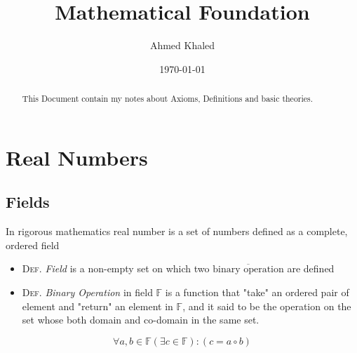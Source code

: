 \documentclass[11pt, a4paper]{article}
\author{Ahmed Khaled}
\date{\today}
\title{Mathematical Foundation}
\begin{document}
\maketitle
\begin{abstract}
This Document contain my notes about Axioms, Definitions and basic theories.
\end{abstract}

\section{Real Numbers}
\label{sec:org71e7ac2}
\subsection{Fields}
\label{sec:org6fb7fdd}
In rigorous mathematics real number is a set of numbers defined as a complete, ordered field

\begin{itemize}
\item \textsc{Def}. \emph{Field} is a non-empty set on which two \(\overline{\mbox{binary operation}}\) are
defined 

\item \textsc{Def}. \emph{Binary Operation} in field \(\mathbb{F}\) is a function that "take"
an ordered pair of element and "return" an element in \(\mathbb{F}\), and it said to be
the operation on the set whose both domain and co-domain in the same set.
\end{itemize}
\[ \forall a,b \in \mathbb{F} (\exists c \in \mathbb{F}) : (c = a \circ b) \]
\end{document}
